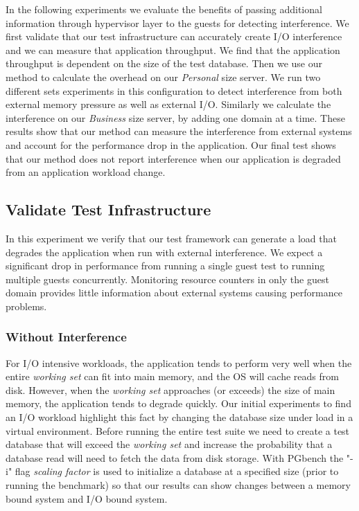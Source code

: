 In the following experiments we evaluate the benefits of passing additional information through hypervisor layer to the  guests for detecting interference.  We first validate that our test infrastructure can accurately create I/O interference and we can measure that application throughput.  We find that the application throughput is dependent on the size of the test database.  Then we use our method to calculate the overhead on our \emph{Personal} size server.  We run two different sets experiments in this configuration to detect interference from both external memory pressure as well as external I/O.   Similarly we calculate the interference on our \emph{Business} size server, by adding one domain at a time.  These results show that our method can measure the interference from external systems and account for the performance drop in the application.  Our final test shows that our method does not report interference when our application is degraded from an application workload change.

\subsection{Validate Test Infrastructure}
In this experiment we verify that our test framework can generate a load that degrades the application when run with external interference.  We expect a significant drop in performance from running a single guest test to running multiple guests concurrently.  Monitoring resource counters in only the guest domain provides little information about external systems causing performance problems. 

\subsubsection{Without Interference}
For I/O intensive workloads, the application tends to perform very well when the entire \emph{working set} can fit into main memory, and the OS will cache reads from disk.  However, when the \emph{working set}  approaches (or exceeds) the size of main memory, the application tends to degrade quickly.  Our initial experiments to find an I/O workload highlight this fact by changing the database size under load in a virtual environment.  Before running the entire test suite we need to create a test database that will exceed the \emph{working set} and increase the probability that a database read will need to fetch the data from disk storage.  With PGbench the "-i" flag \emph{scaling factor} is used to initialize a database at a specified size (prior to running the benchmark) so that our results can show changes between a memory bound system and I/O bound system.  

